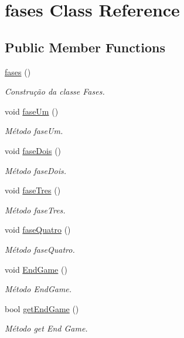 \hypertarget{classfases}{}\section{fases Class Reference}
\label{classfases}
\subsection*{Public Member Functions}
\begin{DoxyCompactItemize}
\item 
\mbox{\hyperlink{classfases_a39d5b42a40a958d25411c51cb2b0959c}{fases}} ()
\begin{DoxyCompactList}\small\item\em Construção da classe Fases. \end{DoxyCompactList}\item 
void \mbox{\hyperlink{classfases_a89059232b76460277f9846fc6d66488c}{fase\+Um}} ()
\begin{DoxyCompactList}\small\item\em Método fase\+Um. \end{DoxyCompactList}\item 
void \mbox{\hyperlink{classfases_a2f19632bd94eacd6c5437a2774bc529f}{fase\+Dois}} ()
\begin{DoxyCompactList}\small\item\em Método fase\+Dois. \end{DoxyCompactList}\item 
void \mbox{\hyperlink{classfases_a05138769008d5c7d1b548916ecfa9f34}{fase\+Tres}} ()
\begin{DoxyCompactList}\small\item\em Método fase\+Tres. \end{DoxyCompactList}\item 
void \mbox{\hyperlink{classfases_af33d3aefdf442b1ea726645b0c946d78}{fase\+Quatro}} ()
\begin{DoxyCompactList}\small\item\em Método fase\+Quatro. \end{DoxyCompactList}\item 
void \mbox{\hyperlink{classfases_aa05ea0c25d2c70ee022f56f02003b4b5}{End\+Game}} ()
\begin{DoxyCompactList}\small\item\em Método End\+Game. \end{DoxyCompactList}\item 
bool \mbox{\hyperlink{classfases_aedbb30c3e8ad0b50e96561029aecdf4a}{get\+End\+Game}} ()
\begin{DoxyCompactList}\small\item\em Método get End Game. \end{DoxyCompactList}\end{DoxyCompactItemize}
